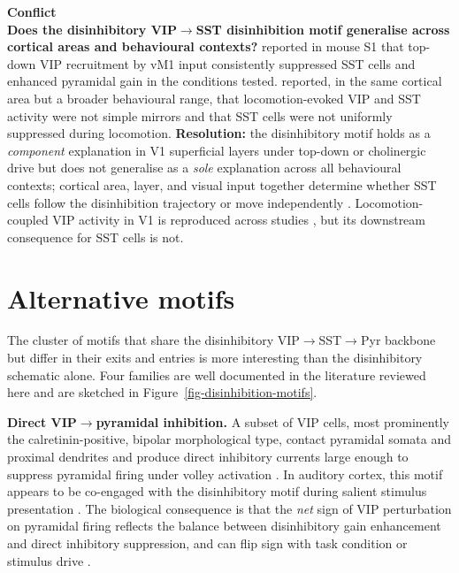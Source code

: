 \documentclass[11pt]{article}
\let\origrightarrow\rightarrow
\def\rightarrow{\ensuremath{\origrightarrow}}
\begin{document}
\begin{framed}
\textbf{Conflict}\\
\textbf{Does the disinhibitory VIP\rightarrow SST disinhibition motif generalise across cortical areas and behavioural contexts?} \citet{Lee2013} reported in mouse S1 that top-down VIP recruitment by vM1 input consistently suppressed SST cells and enhanced pyramidal gain in the conditions tested. \citet{Pakan2016} reported, in the same cortical area but a broader behavioural range, that locomotion-evoked VIP and SST activity were not simple mirrors and that SST cells were not uniformly suppressed during locomotion. \textbf{Resolution:} the disinhibitory motif holds as a \textit{component} explanation in V1 superficial layers under top-down or cholinergic drive but does not generalise as a \textit{sole} explanation across all behavioural contexts; cortical area, layer, and visual input together determine whether SST cells follow the disinhibition trajectory or move independently \citep{Dipoppa2018, Garrett2020, Stachniak2021, Veit2023}. Locomotion-coupled VIP activity in V1 is reproduced across studies \citep{Fu2014, Pakan2016, Dipoppa2018}, but its downstream consequence for SST cells is not.
\end{framed}

\section{Alternative motifs}

The cluster of motifs that share the disinhibitory VIP\rightarrow SST\rightarrow Pyr backbone but differ in their exits and entries is more interesting than the disinhibitory schematic alone. Four families are well documented in the literature reviewed here and are sketched in Figure~\ref{fig-disinhibition-motifs}.

\textbf{Direct VIP\rightarrow pyramidal inhibition.} A subset of VIP cells, most prominently the calretinin-positive, bipolar morphological type, contact pyramidal somata and proximal dendrites and produce direct inhibitory currents large enough to suppress pyramidal firing under volley activation \citep{Karnani2016a, Schneidermizell2025}. In auditory cortex, this motif appears to be co-engaged with the disinhibitory motif during salient stimulus presentation \citep{Pi2013, Kuchibhotla2017}. The biological consequence is that the \textit{net} sign of VIP perturbation on pyramidal firing reflects the balance between disinhibitory gain enhancement and direct inhibitory suppression, and can flip sign with task condition or stimulus drive \citep{Garciadelmolino2017, Hertag2019}.
\end{document}

